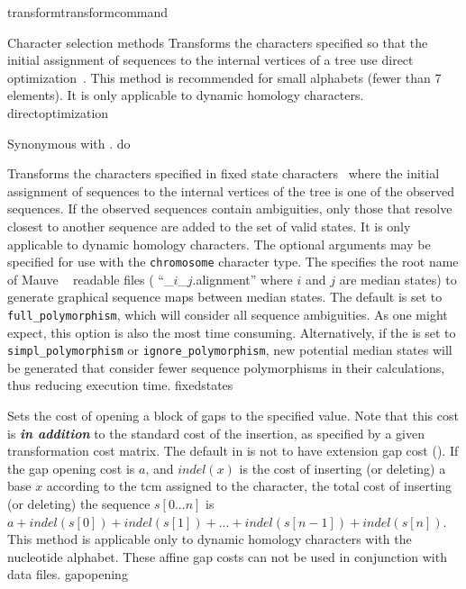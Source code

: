 \begin{command}{transform}{transformcommand}
\begin{arguments}
\begin{argumentgroup}{Character selection methods}
{Transforms the characters specified so that the initial assignment of sequences to 
the internal vertices of a tree use direct
optimization~\cite{wheeler1996}. This method is recommended for small
alphabets (fewer than 7 elements). It is only applicable to dynamic homology
characters.}
{directoptimization}

{Synonymous with .}
{do}

{Transforms the characters specified in fixed state characters~\cite{wheeler1999a}
where the initial assignment of sequences to the internal vertices of
the tree is one of the observed sequences. If the observed sequences
contain ambiguities, only those that resolve closest to another
sequence are added to the set of valid states. It is only
applicable to dynamic homology characters. The optional arguments 
may be specified for use with the \texttt{chromosome} character type. 
The \poystring specifies the root name of Mauve ~\cite{darlingetal2004} 
readable files ( ``\poystring\_$i$\_$j$.alignment'' where $i$ and $j$ are 
median states) to generate graphical sequence maps between median states. 
The default \poylident is set to \texttt{full\_polymorphism}, which will 
consider all sequence ambiguities. As one might expect, this option is also the most 
time consuming. Alternatively, if the \poylident is set to \texttt{simpl\_polymorphism} 
or \texttt{ignore\_polymorphism}, new potential median states will be generated that consider fewer 
sequence polymorphisms in their calculations, thus reducing execution time.}
{fixedstates}

{Sets the cost of opening a block of gaps to the specified value. Note that
this cost is {\bf \emph{in addition}} to the standard cost of the insertion, as
specified by a given transformation cost matrix.
The default in \poy is not to have extension
gap cost (). If the gap
opening cost is
$a$, and $indel(x)$ is the cost of inserting (or deleting) a
base $x$ according to the tcm assigned to the character, the total
cost of inserting (or deleting) the sequence $s[0...n]$ is $a +
indel(s[0]) + indel(s[1]) + ... + indel(s[n - 1]) + indel(s[n]).$
This method is applicable only to dynamic homology characters with
the nucleotide alphabet. These affine gap costs can not be used
in conjunction with  data files.} 
{gapopening}


\end{argumentgroup}
\end{arguments}
\end{command}
